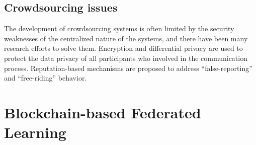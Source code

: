 \documentclass{article}
\begin{document}
\subsection{Crowdsourcing issues}

The development of crowdsourcing systems is often limited by the security weaknesses of the centralized nature of the systems, and there have been many research efforts to solve them. Encryption and differential privacy are used to protect the data privacy of all participants who involved in the communication process. Reputation-based mechanisms are proposed to address “false-reporting” and “free-riding” behavior.

%


\section{Blockchain-based Federated Learning}
\end{document}
